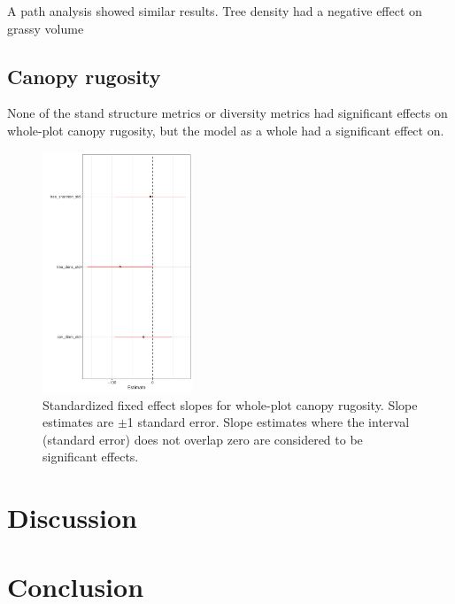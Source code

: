 \documentclass[11pt,a4paper]{article}
\newcommand{\beginsupplement}{%
	\setcounter{table}{0}
	\renewcommand{\thetable}{S\arabic{table}}%
	\setcounter{figure}{0}
	\renewcommand{\thefigure}{S\arabic{figure}}%
}
\begin{document}
A path analysis showed similar results. Tree density had a negative effect on grassy volume

\subsection{Canopy rugosity}

None of the stand structure metrics or diversity metrics had significant effects on whole-plot canopy rugosity, but the model as a whole had a significant effect on.

\begin{figure}[H]
\centering
	\includegraphics[width=0.4\textwidth]{rugosity_mod_slopes}
	\caption{Standardized fixed effect slopes for whole-plot canopy rugosity. Slope estimates are $\pm$1 standard error. Slope estimates where the interval (standard error) does not overlap zero are considered to be significant effects.}
	\label{rugosity_mod_slopes}
\end{figure}

\section{Discussion}



\section{Conclusion}

\printbibliography

\end{document}
